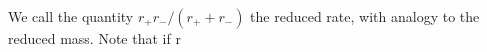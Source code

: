 We call the quantity \(r_+r_-/(r_++r_-)\) the reduced rate, with analogy to the reduced mass.  Note that if r